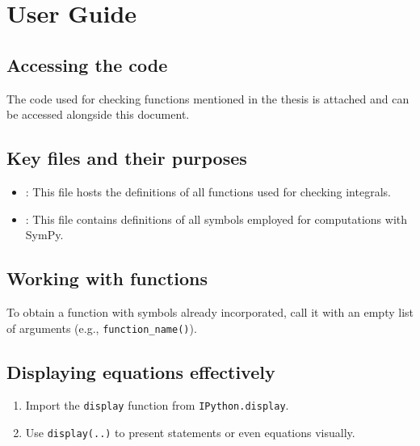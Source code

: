 \section{User Guide}\label{sec:user-guide}

\subsection{Accessing the code}\label{subsec:accessing-the-code}

The code used for checking functions mentioned in the thesis is attached
and can be accessed alongside this document.

\subsection{Key files and their purposes}\label{subsec:key-files-and-their-purposes}

\begin{itemize}
    \item {}:
    This file hosts the definitions of all functions used for checking integrals.
    \item {}:
    This file contains definitions of all symbols employed for computations with SymPy.
\end{itemize}

\subsection{Working with functions}\label{subsec:working-with-functions}

To obtain a function with symbols already incorporated,
call it with an empty list of arguments (e.g., \texttt{function_name()}).

\subsection{Displaying equations effectively}\label{subsec:displaying-equations-effectively}

\begin{enumerate}
    \item Import the \texttt{display} function from \texttt{IPython.display}.
    \item Use \texttt{display(..)} to present statements or even equations visually.
\end{enumerate}

